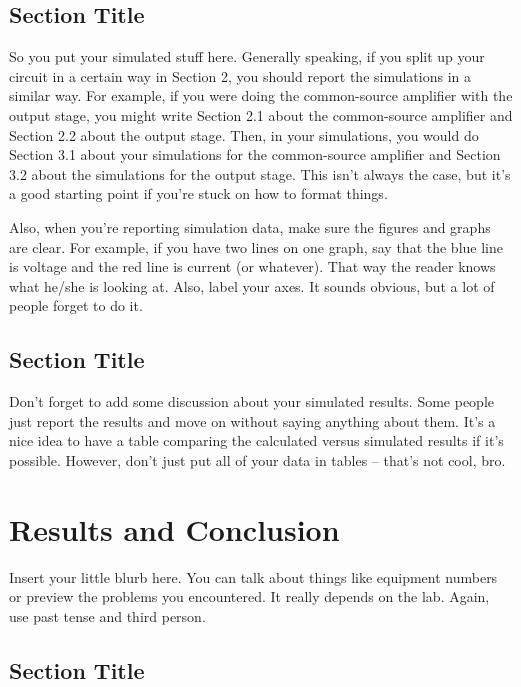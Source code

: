 \documentclass[10pt]{article}
\begin{document}
\subsection{Section Title}

\noindent So you put your simulated stuff here. Generally speaking, if you split up your circuit in a certain way in Section 2, you should report the simulations in a similar way. For example, if you were doing the common-source amplifier with the output stage, you might write Section 2.1 about the common-source amplifier and Section 2.2 about the output stage. Then, in your simulations, you would do Section 3.1 about your simulations for the common-source amplifier and Section 3.2 about the simulations for the output stage. This isn’t always the case, but it’s a good starting point if you’re stuck on how to format things.
\newline

\noindent Also, when you’re reporting simulation data, make sure the figures and graphs are clear. For example, if you have two lines on one graph, say that the blue line is voltage and the red line is current (or whatever). That way the reader knows what he/she is looking at. Also, label your axes. It sounds obvious, but a lot of people forget to do it.

\subsection{Section Title}

\noindent Don’t forget to add some discussion about your simulated results. Some people just report the results and move on without saying anything about them. It’s a nice idea to have a table comparing the calculated versus simulated results if it’s possible. However, don’t just put all of your data in tables – that’s not cool, bro.

\section{Results and Conclusion}

\noindent Insert your little blurb here. You can talk about things like equipment numbers or preview the problems you encountered. It really depends on the lab. Again, use past tense and third person.

\subsection{Section Title}
\end{document}
